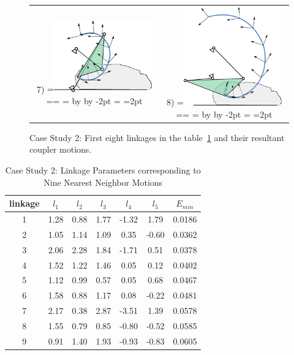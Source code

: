 \documentclass[twocolumn,10pt]{asme2ej}
\makeatletter
\newcommand{\putindeepbox}[2][0.7\baselineskip]{{%
    \setbox0=\hbox{#2}%
    \setbox0=\vbox{\noindent\hsize=\wd0\unhbox0}
    \@tempdima=\dp0
    \advance\@tempdima by \ht0
    \advance\@tempdima by -#1\relax
    \dp0=\@tempdima
    \ht0=#1\relax
    \box0
}}
\makeatother
\begin{document}
\begin{figure}
\begin{tabular}{cc}
  7)\putindeepbox[2pt]{\includegraphics[width=120pt]{figure/sol8.eps}}
    & 8)\putindeepbox[2pt]{\includegraphics[width=120pt]{figure/sol9.eps}}\\
\end{tabular}
\caption{Case Study 2: First eight linkages in the table~\ref{ex2_knnLinkageData} and their resultant coupler motions.}
\label{ex2_solns}
\end{figure}

\begin{table}
\caption{Case Study 2: Linkage Parameters corresponding to Nine Nearest Neighbor Motions}
\centering
\label{ex2_knnLinkageData}
\begin{tabular}{ccccccc}
\hline
  linkage & $l_1$ & $l_2$ & $l_3$ & $l_4$ & $l_5$ & $E_{min}$ \\
\hline
 1 & 1.28 & 0.88 & 1.77 & -1.32 & 1.79 & 0.0186   \\
 2 & 1.05 & 1.14 & 1.09 & 0.35 & -0.60 & 0.0362   \\
 3 & 2.06 & 2.28 & 1.84 & -1.71 & 0.51 & 0.0378   \\
 4 & 1.52 & 1.22 & 1.46 & 0.05 & 0.12 & 0.0402    \\
 5 & 1.12 & 0.99 & 0.57 & 0.05 & 0.68 & 0.0467    \\
 6 & 1.58 & 0.88 & 1.17 & 0.08 & -0.22 & 0.0481   \\
 7 & 2.17 & 0.38 & 2.87 & -3.51 & 1.39 & 0.0578   \\
 8 & 1.55 & 0.79 & 0.85 & -0.80 & -0.52 & 0.0585  \\
 9 & 0.91 & 1.40 & 1.93 & -0.93 & -0.83 & 0.0605
\end{tabular}
\end{table}
\end{document}
